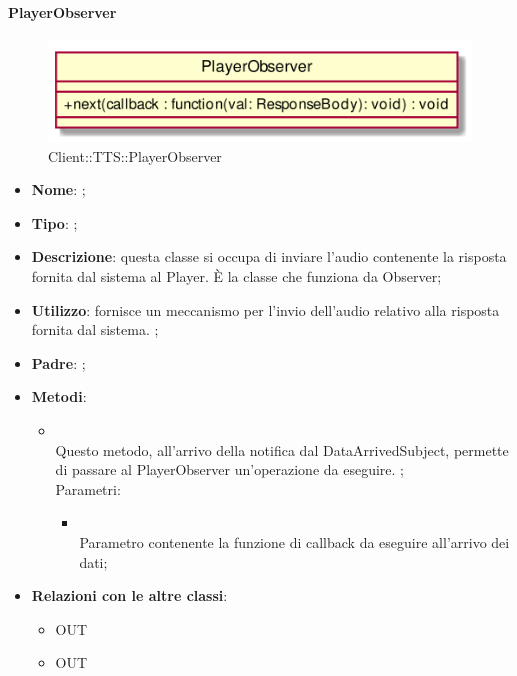 \hypertarget{PlayerObserver_label}{\paragraph{PlayerObserver}}
\begin{figure}[h]
	\centering
	\includegraphics[width=\textwidth,height=\textheight,keepaspectratio]{images/ClassPlayerObserver.png}
	\caption{Client::TTS::PlayerObserver}
\end{figure}
\begin{itemize}
	\item \textbf{Nome}: ;
	\item \textbf{Tipo}: ;
	\item \textbf{Descrizione}: questa classe si occupa di inviare l'audio contenente la risposta fornita dal sistema al Player.
È la classe che funziona da Observer;
	\item \textbf{Utilizzo}: fornisce un meccanismo per l'invio dell'audio relativo alla risposta fornita dal sistema. ;
	\item \textbf{Padre}: ;
	\item \textbf{Metodi}:
	\begin{itemize}
		\item[]  \\
		Questo metodo, all'arrivo della notifica dal DataArrivedSubject, permette di passare al PlayerObserver un'operazione da eseguire. ;\\
		Parametri:
		\begin{itemize}
			\item {} \\
			Parametro contenente la funzione di callback da eseguire all'arrivo dei dati;
		\end{itemize}
	\end{itemize}
	\item \textbf{Relazioni con le altre classi}:
	\begin{itemize}
		\item OUT \hyperlink{Player_label}{}
		\item OUT \hyperlink{DataArrivedObservable_label}{}
	\end{itemize}
\end{itemize}

